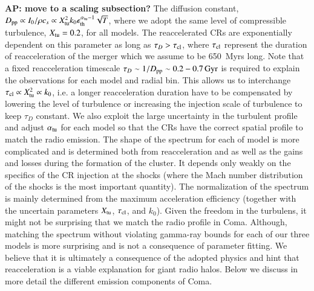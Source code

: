 \documentclass[a4paper,fleqn,usenatbib]{mnras}
\def\AP#1{{\bf  AP: #1}}
\begin{document}
\AP{move to a scaling subsection?} The diffusion constant,
$D_{\mathrm{pp}}\propto I_0/\rho c_s \propto
X_{\mathrm{tu}}^2k_0\epsilon_{\mathrm{th}}^{\alpha_{\mathrm{tu}}-1}\sqrt{T}$, where
we adopt the same level of compressible turbulence, $X_{\mathrm{tu}}=0.2$,
for all models. The reaccelerated CRs are exponentially dependent on
this parameter as long as $\tau_D > \tau_{\mathrm{cl}}$, where
$\tau_{\mathrm{cl}}$ represent the duration of reacceleration of the merger
which we assume to be 650~Myrs long. Note that a fixed reacceleration
timescale $\tau_D\sim 1/D_{\mathrm{pp}}\sim 0.2-0.7\,{\mathrm{Gyr}}$ is required
to explain the observations for each model and radial bin. This allows
us to interchange $\tau_{\mathrm{cl}} \propto X_{\mathrm{tu}}^2 \propto k_0$,
i.e. a longer reacceleration duration have to be compensated by
lowering the level of turbulence or increasing the injection scale of
turbulence to keep $\tau_D$ constant. We also exploit the large
uncertainty in the turbulent profile and adjust $\alpha_{\mathrm{tu}}$ for
each model so that the CRs have the correct spatial profile to match
the radio emission. The shape of the spectrum for each of model is
more complicated and is determined both from reacceleration and as
well as the gains and losses during the formation of the cluster. It
depends only weakly on the specifics of the CR injection at the shocks
(where the Mach number distribution of the shocks is the most
important quantity). The normalization of the spectrum is mainly
determined from the maximum acceleration efficiency (together with the
uncertain parameters $X_{\mathrm{tu}}$, $\tau_{\mathrm{cl}}$, and $k_0$). Given
the freedom in the turbulens, it might not be surprising that we match
the radio profile in Coma. Although, matching the spectrum without
violating gamma-ray bounds for each of our three models is more
surprising and is not a consequence of parameter fitting. We believe
that it is ultimately a consequence of the adopted physics and hint
that reacceleration is a viable explanation for giant radio
halos. Below we discuss in more detail the different emission
components of Coma.
\end{document}
